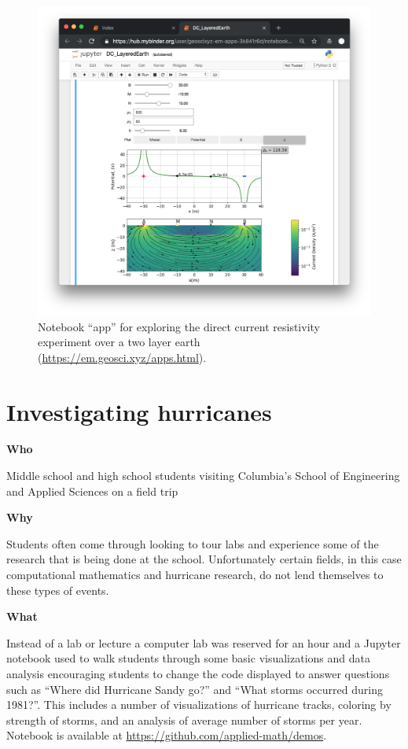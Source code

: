 \documentclass[]{book}
\begin{document}
\begin{figure}
\centering
\includegraphics{images/DC-layered-earth-app.png}
\caption{Notebook ``app'' for exploring the direct current resistivity
experiment over a two layer earth
(\url{https://em.geosci.xyz/apps.html}).}
\end{figure}

\section{Investigating hurricanes}\label{investigating-hurricanes}

\textbf{Who }

Middle school and high school students visiting Columbia's School of
Engineering and Applied Sciences on a field trip

\textbf{Why }

Students often come through looking to tour labs and experience some of
the research that is being done at the school. Unfortunately certain
fields, in this case computational mathematics and hurricane research,
do not lend themselves to these types of events.

\textbf{What }

Instead of a lab or lecture a computer lab was reserved for an hour and
a Jupyter notebook used to walk students through some basic
visualizations and data analysis encouraging students to change the code
displayed to answer questions such as ``Where did Hurricane Sandy go?''
and ``What storms occurred during 1981?''. This includes a number of
visualizations of hurricane tracks, coloring by strength of storms, and
an analysis of average number of storms per year. Notebook is available
at \url{https://github.com/applied-math/demos}.
\end{document}
